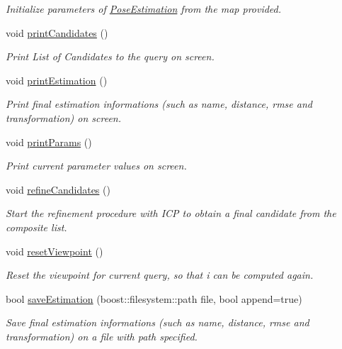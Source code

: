 \begin{DoxyCompactItemize}
\begin{DoxyCompactList}\small\item\em Initialize parameters of \hyperlink{classPoseEstimation}{Pose\-Estimation} from the map provided. \end{DoxyCompactList}\item 
void \hyperlink{classPoseEstimation_ac6fee319b5bc9464cc866aaaf99f6a5c}{print\-Candidates} ()
\begin{DoxyCompactList}\small\item\em Print List of Candidates to the query on screen. \end{DoxyCompactList}\item 
void \hyperlink{classPoseEstimation_a2db4ea74cd5715110e5a89422be4cc26}{print\-Estimation} ()
\begin{DoxyCompactList}\small\item\em Print final estimation informations (such as name, distance, rmse and transformation) on screen. \end{DoxyCompactList}\item 
void \hyperlink{classPoseEstimation_a7f162e3e5383f895d7b6d1cd228ca076}{print\-Params} ()
\begin{DoxyCompactList}\small\item\em Print current parameter values on screen. \end{DoxyCompactList}\item 
void \hyperlink{classPoseEstimation_a808b372ea678164e3a794f695cb2350a}{refine\-Candidates} ()
\begin{DoxyCompactList}\small\item\em Start the refinement procedure with I\-C\-P to obtain a final candidate from the composite list. \end{DoxyCompactList}\item 
void \hyperlink{classPoseEstimation_a27e19c1dac9d253a8c3b9ddc2c6ae5f3}{reset\-Viewpoint} ()
\begin{DoxyCompactList}\small\item\em Reset the viewpoint for current query, so that i can be computed again. \end{DoxyCompactList}\item 
bool \hyperlink{classPoseEstimation_aacbe03c27914842bdc8143bc3c588ec4}{save\-Estimation} (boost\-::filesystem\-::path file, bool append=true)
\begin{DoxyCompactList}\small\item\em Save final estimation informations (such as name, distance, rmse and transformation) on a file with path specified. \end{DoxyCompactList}\item 

\end{DoxyCompactItemize}

